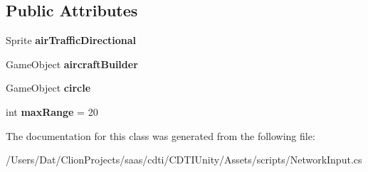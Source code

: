 \subsection*{Public Attributes}
\begin{DoxyCompactItemize}
\item 
Sprite {\bfseries air\+Traffic\+Directional}\hypertarget{class_network_input_a645c85b706841b9efd9be62cecff9e37}{}\label{class_network_input_a645c85b706841b9efd9be62cecff9e37}

\item 
Game\+Object {\bfseries aircraft\+Builder}\hypertarget{class_network_input_a4cbaddf7224566f6a01d23a1788b723d}{}\label{class_network_input_a4cbaddf7224566f6a01d23a1788b723d}

\item 
Game\+Object {\bfseries circle}\hypertarget{class_network_input_a8465b038857f973c9a8b7513ead2b563}{}\label{class_network_input_a8465b038857f973c9a8b7513ead2b563}

\item 
int {\bfseries max\+Range} = 20\hypertarget{class_network_input_a3b50fccf39e33592acc615ab7f70abe8}{}\label{class_network_input_a3b50fccf39e33592acc615ab7f70abe8}

\end{DoxyCompactItemize}


The documentation for this class was generated from the following file\+:\begin{DoxyCompactItemize}
\item 
/\+Users/\+Dat/\+Clion\+Projects/saas/cdti/\+C\+D\+T\+I\+Unity/\+Assets/scripts/Network\+Input.\+cs\end{DoxyCompactItemize}
